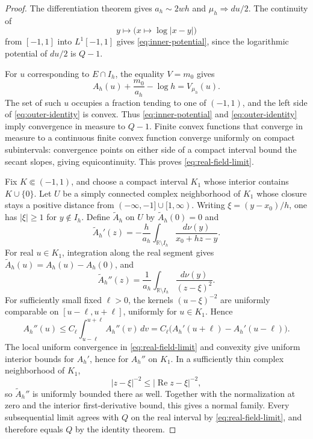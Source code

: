 \documentclass[11pt]{article}
\theoremstyle{definition}
\numberwithin{equation}{section}
\newcommand{\R}{\mathbb R}
\begin{document}
\begin{proof}
The differentiation theorem gives \(a_h\sim2wh\) and
\(\mu_h\Rightarrow du/2\). The continuity of
\[
 y\longmapsto\bigl(x\longmapsto\log|x-y|\bigr)
\]
from \([-1,1]\) into \(L^1[-1,1]\) gives
\eqref{eq:inner-potential}, since the logarithmic potential of
\(du/2\) is \(Q-1\).

For \(u\) corresponding to \(E\cap I_h\), the equality \(V=m_0\)
gives
\begin{equation}\label{eq:outer-identity}
 A_h(u)+\frac{m_0}{a_h}-\log h=V_{\mu_h}(u).
\end{equation}
The set of such \(u\) occupies a fraction tending to one of
\((-1,1)\), and the left side of \eqref{eq:outer-identity} is convex.
Thus \eqref{eq:inner-potential} and \eqref{eq:outer-identity} imply
convergence in measure to \(Q-1\). Finite convex functions that
converge in measure to a continuous finite convex function converge
uniformly on compact subintervals: convergence points on either side
of a compact interval bound the secant slopes, giving equicontinuity.
This proves \eqref{eq:real-field-limit}.

Fix \(K\Subset(-1,1)\), and choose a compact interval \(K_1\) whose
interior contains \(K\cup\{0\}\). Let \(U\) be a simply connected
complex neighborhood of \(K_1\) whose closure stays a positive
distance from \(( -\infty,-1]\cup[1,\infty)\). Writing
\(\xi=(y-x_0)/h\), one has \(|\xi|\ge1\) for \(y\notin I_h\). Define
\(\widetilde A_h\) on \(U\) by \(\widetilde A_h(0)=0\) and
\[
 \widetilde A_h'(z)
 =-\frac{h}{a_h}\int_{\R\setminus I_h}
   \frac{d\nu(y)}{x_0+hz-y}.
\]
For real \(u\in K_1\), integration along the real segment gives
\(\widetilde A_h(u)=A_h(u)-A_h(0)\), and
\[
 \widetilde A_h''(z)
 =\frac1{a_h}\int_{\R\setminus I_h}\frac{d\nu(y)}{(z-\xi)^2}.
\]
For sufficiently small fixed \(\ell>0\), the kernels
\((u-\xi)^{-2}\) are uniformly comparable on
\([u-\ell,u+\ell]\), uniformly for \(u\in K_1\). Hence
\[
 A_h''(u)
 \le C_\ell\int_{u-\ell}^{u+\ell}A_h''(v)\,dv
 =C_\ell\bigl(A_h'(u+\ell)-A_h'(u-\ell)\bigr).
\]
The local uniform convergence in \eqref{eq:real-field-limit} and
convexity give uniform interior bounds for \(A_h'\), hence for
\(A_h''\) on \(K_1\). In a sufficiently thin complex neighborhood of
\(K_1\),
\[
 |z-\xi|^{-2}\le|\operatorname{Re}z-\xi|^{-2},
\]
so \(\widetilde A_h''\) is uniformly bounded there as well. Together
with the normalization at zero and the interior first-derivative
bound, this gives a normal family. Every subsequential limit agrees
with \(Q\) on the real interval by \eqref{eq:real-field-limit}, and
therefore equals \(Q\) by the identity theorem.
\end{proof}
\end{document}
